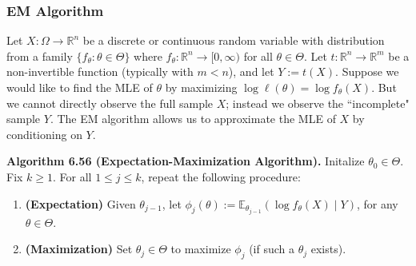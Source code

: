\documentclass{article}
\newcommand{\E}{\mathbb{E}}
\theoremstyle{definition}
\theoremstyle{definition}
\theoremstyle{definition}
\theoremstyle{definition}
\theoremstyle{definition}
\theoremstyle{definition}
\theoremstyle{definition}
\begin{document}
\subsubsection{EM Algorithm}

Let \(X: \Omega \to \mathbb{R}^n\) be a discrete or continuous random variable with distribution from a family \(\{f_\theta: \theta \in \Theta\}\) where \(f_\theta: \mathbb{R}^n \to [0, \infty)\) for all \(\theta \in \Theta\). Let \(t: \mathbb{R}^n \to \mathbb{R}^m\) be a non-invertible function (typically with \(m < n\)), and let \(Y:= t(X)\). Suppose we would like to find the MLE of \(\theta\) by maximizing \(\log \ell(\theta) = \log f_\theta(X)\). But we cannot directly observe the full sample \(X\); instead we observe the ``incomplete" sample \(Y\). The EM algorithm allows us to approximate the MLE of \(X\) by conditioning on \(Y\).

\textbf{Algorithm 6.56 (Expectation-Maximization Algorithm).} Initalize \(\theta_0 \in \Theta\). Fix \(k \geq 1\). For all \(1 \leq j \leq k\), repeat the following procedure:

\begin{enumerate}[(1)]

\item \textbf{(Expectation)} Given \(\theta_{j-1}\), let \(\phi_j(\theta) := \E_{\theta_{j-1}} ( \log f_\theta(X) \mid Y )\), for any \(\theta \in \Theta\).

\item  \textbf{(Maximization)} Set \(\theta_j \in \Theta\) to maximize \(\phi_j\) (if such a \(\theta_j\) exists).

\end{enumerate}
\end{document}
